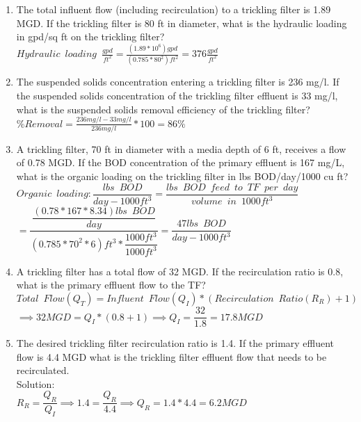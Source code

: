 \documentclass{article}
\begin{document}
\begin{enumerate}
\item The total influent flow (including recirculation) to a trickling filter is 1.89 MGD. If the trickling filter is 80 ft in diameter, what is the hydraulic loading in gpd/sq ft on the trickling filter?\\
\vspace{1cm}
 $Hydraulic \enspace loading \enspace \frac{gpd}{ft^2}=\frac{(1.89*10^6)gpd}{(0.785*80^2)ft^2} =\boxed{376\frac{gpd}{ft^2}}$
\item  The suspended solids concentration entering a trickling filter is 236 mg/l. If the suspended solids concentration of the trickling filter effluent is 33 mg/l, what is the suspended solids removal efficiency of the trickling filter?\\
\vspace{1cm}
$\% Removal=\frac{236 mg/l-33 mg/l}{236 mg/l}*100=\boxed{86\%}$
\newpage

\item  A trickling filter, 70 ft in diameter with a media depth of 6 ft, receives a flow of 0.78 MGD. If the BOD concentration of the primary effluent is 167 mg/L, what is the organic loading on the trickling filter in lbs BOD/day/1000 cu ft?\\
\vspace{1cm}
$Organic \enspace loading:\dfrac{lbs \enspace BOD}{day-1000ft^3}=\dfrac{lbs \enspace BOD \enspace feed \enspace to \enspace TF \enspace per \enspace day}{volume \enspace in \enspace 1000ft^3}$\\
\vspace{0.3cm}
$=\dfrac{\dfrac{(0.78*167*8.34)lbs \enspace BOD}{day}}{(0.785*70^2*6)ft^3*\dfrac{1000ft^3}{1000ft^3}}=\boxed{\dfrac{47 lbs \enspace BOD}{day-1000 ft^3}}$


\item A trickling filter has a total flow of 32 MGD.  If the recirculation ratio is 0.8, what is the primary effluent flow to the TF?\\
\vspace{1cm}
$Total \enspace Flow (Q_T) = Influent \enspace Flow (Q_I)*(Recirculation \enspace Ratio(R_R) +1)$\\
$\implies 32 MGD=Q_I*(0.8+1)\implies Q_I=\dfrac{32}{1.8}=\boxed{17.8 MGD}$

\item The desired trickling filter recirculation ratio is 1.4.  If the primary effluent flow is 4.4 MGD what is the trickling filter effluent flow that needs to be recirculated.\\
Solution:\\
$R_R=\dfrac{Q_R}{Q_I}\implies 1.4=\dfrac{Q_R}{4.4}\implies Q_R =1.4*4.4=\boxed{6.2 MGD}$\\





\end{enumerate}
\end{document}
